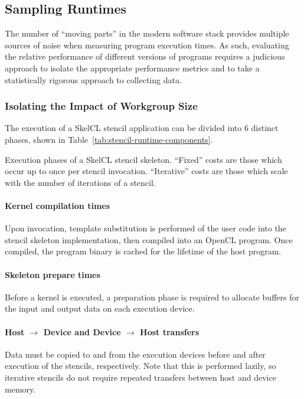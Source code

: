 \subsection{Sampling Runtimes}

The number of ``moving parts'' in the modern software stack provides
multiple sources of noise when measuring program execution times. As
such, evaluating the relative performance of different versions of
programs requires a judicious approach to isolate the appropriate
performance metrics and to take a statistically rigorous approach to
collecting data.


\subsubsection{Isolating the Impact of Workgroup Size}

The execution of a SkelCL stencil application can be divided into 6
distinct phases, shown in Table~\ref{tab:stencil-runtime-components}.


\begin{table}

\caption{Execution phases of a SkelCL stencil skeleton. ``Fixed''
  costs are those which occur up to once per stencil
  invocation. ``Iterative'' costs are those which scale with the
  number of iterations of a stencil.}
\label{tab:stencil-runtime-components}
\end{table}

\paragraph{Kernel compilation times} Upon invocation, template
substitution is performed of the user code into the stencil skeleton
implementation, then compiled into an OpenCL program. Once compiled,
the program binary is cached for the lifetime of the host program.

\paragraph{Skeleton prepare times} Before a kernel is executed, a
preparation phase is required to allocate buffers for the input and
output data on each execution device.

\paragraph{Host $\rightarrow$ Device and Device $\rightarrow$ Host
  transfers} Data must be copied to and from the execution devices
before and after execution of the stencils, respectively. Note that
this is performed lazily, so iterative stencils do not require
repeated transfers between host and device memory.

